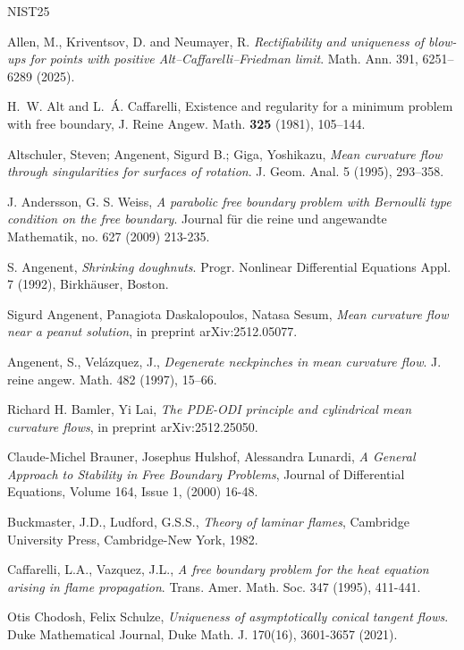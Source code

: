 \documentclass[11pt]{article}
\numberwithin{equation}{section}
\theoremstyle{definition}
\begin{document}
\begin{thebibliography}{NIST25}

 Allen, M., Kriventsov, D. and Neumayer, R. \textit{Rectifiability and uniqueness of blow-ups for points with positive Alt–Caffarelli–Friedman limit}. Math. Ann. 391, 6251–6289 (2025).

 H.~W. Alt and L.~\'A. Caffarelli, Existence and regularity for a minimum problem with free boundary, J. Reine Angew. Math. {\bf 325} (1981), 105--144.


 Altschuler, Steven; Angenent, Sigurd B.; Giga, Yoshikazu, \textit{Mean curvature flow through
singularities for surfaces of rotation}. J. Geom. Anal. 5 (1995), 293–358.

 J. Andersson, G. S. Weiss, \textit{A parabolic free boundary problem with Bernoulli type condition on the free boundary}. Journal f\"ur die reine und angewandte Mathematik, no. 627 (2009) 213-235.  

 S. Angenent, \textit{Shrinking doughnuts}. Progr. Nonlinear Differential Equations Appl. 7 (1992), Birkh\"{a}user, Boston.

 Sigurd Angenent, Panagiota Daskalopoulos, Natasa Sesum, \textit{Mean curvature flow near a peanut solution}, in preprint arXiv:2512.05077.

 Angenent, S., Vel\'{a}zquez, J., \textit{Degenerate neckpinches in mean curvature flow}. J. reine angew. Math. 482 (1997), 15–66.

 Richard H. Bamler, Yi Lai, \textit{The PDE-ODI principle and cylindrical mean curvature flows}, in preprint arXiv:2512.25050.

 Claude-Michel Brauner, Josephus Hulshof, Alessandra Lunardi, \textit{A General Approach to Stability in Free Boundary Problems}, Journal of Differential Equations, Volume 164, Issue 1, (2000) 16-48.

 Buckmaster, J.D., Ludford, G.S.S., \textit{Theory of laminar flames}, Cambridge University Press, Cambridge-New York, 1982.

 Caffarelli, L.A., Vazquez, J.L., \textit{A free boundary problem for the heat equation arising in flame propagation}. Trans. Amer. Math. Soc. 347 (1995), 411-441.

 Otis Chodosh, Felix Schulze, \textit{Uniqueness of asymptotically conical tangent flows}. Duke Mathematical Journal, Duke Math. J. 170(16), 3601-3657 (2021).


\end{thebibliography}
\end{document}
